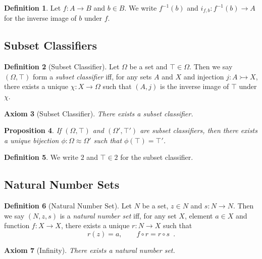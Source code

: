 \documentclass{book}
\newtheorem{prop}{Proposition}[chapter]
\newtheorem{ax}[prop]{Axiom}
\theoremstyle{definition}
\newtheorem{df}[prop]{Definition}
\begin{document}

\begin{df}
Let $f : A \rightarrow B$ and $b \in B$. We write $f^{-1}(b)$ and $i_{f,b} : f^{-1}(b) \rightarrow A$ for the inverse image of $b$ under $f$.
\end{df}

\subsection{Subset Classifiers}

\begin{df}[Subset Classifier]
Let $\Omega$ be a set and $\top \in \Omega$. Then we say $(\Omega, \top)$ form a \emph{subset classifier} iff, for any sets $A$ and $X$ and injection $j : A \rightarrowtail X$, there exists a unique $\chi : X \rightarrow \Omega$ such that $(A, j)$ is the inverse image of $\top$ under $\chi$.
\end{df}

\begin{ax}[Subset Classifier]
There exists a subset classifier.
\end{ax}

\begin{prop}
If $(\Omega, \top)$ and $(\Omega', \top')$ are subset classifiers, then there exists a unique bijection $\phi : \Omega \approx \Omega'$ such that $\phi(\top) = \top'$.
\end{prop}


\begin{df}
We write $2$ and $\top \in 2$ for the subset classifier.
\end{df}

\subsection{Natural Number Sets}

\begin{df}[Natural Number Set]
Let $N$ be a set, $z \in N$ and $s : N \rightarrow N$. Then we say $(N,z,s)$ is a \emph{natural number set} iff, for any set $X$, element $a \in X$ and function $f : X \rightarrow X$, there exists a unique $r : N \rightarrow X$ such that
\[ r(z) = a, \qquad f \circ r = r \circ s \enspace . \]
\end{df}

\begin{ax}[Infinity]
There exists a natural number set.
\end{ax}
\end{document}
